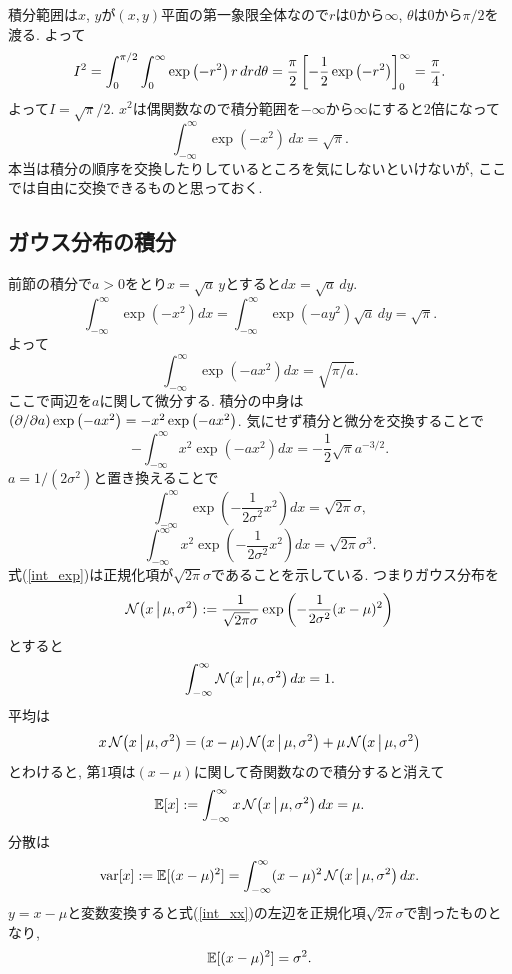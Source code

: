 積分範囲は$x$, $y$が$(x,y)$平面の第一象限全体なので$r$は$0$から$\infty$, $\theta$は$0$から$\pi/2$を渡る.
よって
$$
  I^2
  = \int_0^{\pi/2} \int_0^\infty \exp\left(-r^2\right)r \,dr d\theta
  = \frac{\pi}{2} \left[ -\frac{1}{2}\exp\left(-r^2\right)\right] _0^\infty
  = \frac{\pi}{4}.
$$
よって$I=\sqrt{\pi}/2$. $x^2$は偶関数なので積分範囲を$-\infty$から$\infty$にすると$2$倍になって
$$
\int_{-\infty}^\infty \exp\left(-x^2\right) \,dx = \sqrt{\pi}.
$$
本当は積分の順序を交換したりしているところを気にしないといけないが, ここでは自由に交換できるものと思っておく.

\subsection{ガウス分布の積分}

前節の積分で$a>0$をとり$x=\sqrt{a}\,y$とすると$dx=\sqrt{a}\,dy$.
$$
\int_{-\infty}^\infty \exp\left(-x^2\right) dx =\int_{-\infty}^\infty \exp\left(-ay^2\right)\sqrt{a} \,dy =\sqrt{\pi}.
$$
よって
$$
\int_{-\infty}^\infty \exp\left(-ax^2\right) dx = \sqrt{\pi/a}.
$$
ここで両辺を$a$に関して微分する.
積分の中身は$\psdif{a}\exp\left(-ax^2\right)=-x^2\exp\left(-ax^2\right)$.
気にせず積分と微分を交換することで
$$
-\int_{-\infty}^\infty x^2\exp\left(-ax^2\right) dx = -\frac{1}{2}\sqrt{\pi}a^{-3/2}.
$$
$a=1/(2\sigma^2)$と置き換えることで
\begin{equation}\label{int_exp}
\int_{-\infty}^\infty \exp\left(-\frac{1}{2\sigma^2}x^2\right) dx = \sqrt{2\pi}\sigma,
\end{equation}
\begin{equation}\label{int_xx}
\int_{-\infty}^\infty x^2\exp\left(-\frac{1}{2\sigma^2}x^2\right) dx = \sqrt{2\pi}\sigma^3.
\end{equation}
式(\ref{int_exp})は正規化項が$\sqrt{2\pi}\sigma$であることを示している.
つまりガウス分布を
$$
\fnvPair\calN(x|\mu, \sigma^2):=\frac{1}{\sqrt{2\pi}\sigma}\exp\left(-\frac{1}{2\sigma^2}(x-\mu)^2\right)
$$
とすると
$$
\int_{-\infty}^\infty \fnvPair\calN(x|\mu, \sigma^2) dx=1.
$$
平均は
$$
x \,\fnvPair\calN(x|\mu, \sigma^2)
= (x-\mu) \,\fnvPair\calN(x|\mu, \sigma^2)
  + \mu \,\fnvPair\calN(x|\mu, \sigma^2)
$$
とわけると, 第1項は$(x-\mu)$に関して奇関数なので積分すると消えて
$$
\EE[x]:=\int_{-\infty}^\infty x \,\fnvPair\calN(x|\mu, \sigma^2) dx=\mu.
$$
分散は
$$
\var[x]:=\EE[(x-\mu)^2]=\int_{-\infty}^\infty (x-\mu)^2 \,\fnvPair\calN(x|\mu, \sigma^2) dx.
$$
$y=x-\mu$と変数変換すると式(\ref{int_xx})の左辺を正規化項$\sqrt{2\pi}\sigma$で割ったものとなり,
$$
\mathbb{E}[(x-\mu)^2]=\sigma^2.
$$

